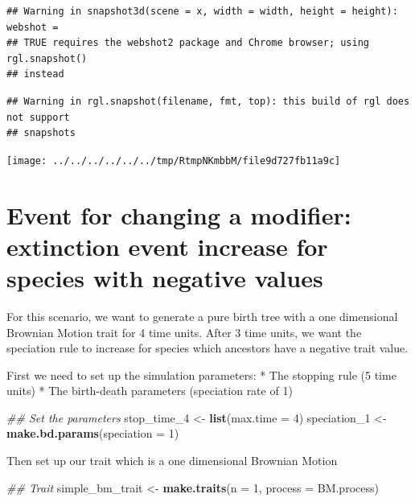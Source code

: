 \documentclass[
]{book}
\newenvironment{Shaded}{\begin{snugshade}}{\end{snugshade}}
\newcommand{\CommentTok}[1]{\textcolor[rgb]{0.56,0.35,0.01}{\textit{#1}}}
\newcommand{\DataTypeTok}[1]{\textcolor[rgb]{0.13,0.29,0.53}{#1}}
\newcommand{\DecValTok}[1]{\textcolor[rgb]{0.00,0.00,0.81}{#1}}
\newcommand{\KeywordTok}[1]{\textcolor[rgb]{0.13,0.29,0.53}{\textbf{#1}}}
\newcommand{\NormalTok}[1]{#1}
\newcommand{\StringTok}[1]{\textcolor[rgb]{0.31,0.60,0.02}{#1}}
\begin{document}
\begin{verbatim}
## Warning in snapshot3d(scene = x, width = width, height = height): webshot =
## TRUE requires the webshot2 package and Chrome browser; using rgl.snapshot()
## instead
\end{verbatim}

\begin{verbatim}
## Warning in rgl.snapshot(filename, fmt, top): this build of rgl does not support
## snapshots
\end{verbatim}

\texttt{[image: ../../../../../../tmp/RtmpNKmbbM/file9d727fb11a9c]}

\hypertarget{EG_change_modif}{%
\section{Event for changing a modifier: extinction event increase for species with negative values}\label{EG_change_modif}}

For this scenario, we want to generate a pure birth tree with a one dimensional Brownian Motion trait for 4 time units.
After 3 time units, we want the speciation rule to increase for species which ancestors have a negative trait value.

First we need to set up the simulation parameters:
* The stopping rule (5 time units)
* The birth-death parameters (speciation rate of 1)

\begin{Shaded}
\begin{Highlighting}[]
\CommentTok{\#\# Set the parameters}
\NormalTok{stop\_time\_}\DecValTok{4}\NormalTok{ \textless{}{-}}\StringTok{ }\KeywordTok{list}\NormalTok{(}\DataTypeTok{max.time =} \DecValTok{4}\NormalTok{)}
\NormalTok{speciation\_}\DecValTok{1}\NormalTok{ \textless{}{-}}\StringTok{ }\KeywordTok{make.bd.params}\NormalTok{(}\DataTypeTok{speciation =} \DecValTok{1}\NormalTok{)}
\end{Highlighting}
\end{Shaded}

Then set up our trait which is a one dimensional Brownian Motion

\begin{Shaded}
\begin{Highlighting}[]
\CommentTok{\#\# Trait}
\NormalTok{simple\_bm\_trait \textless{}{-}}\StringTok{ }\KeywordTok{make.traits}\NormalTok{(}\DataTypeTok{n =} \DecValTok{1}\NormalTok{, }\DataTypeTok{process =}\NormalTok{ BM.process)}
\end{Highlighting}
\end{Shaded}
\end{document}

